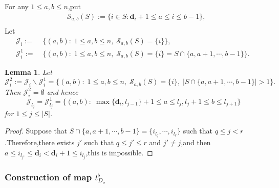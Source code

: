 \documentclass[10pt]{article}
\newtheorem{lem}[thm]{Lemma}
\newcommand{\bd}{{\mathbf{d}}}
\newcommand{\cS}{\mathcal S}
\newcommand{\cJ}{\mathcal J}
\begin{document}
 For any $1\leq a,b\leq n$,\;put
 \begin{equation}
 	\begin{aligned}
 		&\cS_{a,b}(S):=\{i\in S:\bd_i+1\leq a\leq i\leq b-1\},\\
 	\end{aligned}
 \end{equation}
 Let
 \begin{equation}
	\begin{aligned}
		\cJ_i:=&\;\{(a,b):\;1\leq a,b\leq n,\;\cS_{a,b}(S)=\{i\}\},\\
		\cJ^1_i:=&\;\{(a,b):\;1\leq a,b\leq n,\;\cS_{a,b}(S)=\{i\}=S\cap \{a,a+1,\cdots,b-1\}\}.\;
	\end{aligned}
\end{equation}

\begin{lem}\label{lemforcardone} Let 
\begin{equation*}
	\cJ^{2}_i:=\cJ_i\backslash \cJ^1_i=\{(a,b):\;1\leq a,b\leq n,\;\cS_{a,b}(S)=\{i\},\;|S\cap \{a,a+1,\cdots,b-1\}|>1\}.\;
\end{equation*}
Then $\cJ^{2}_i=\emptyset$ and hence
	\[\cJ_{l_j}=\cJ^1_{l_j}=\{(a,b):\;\max\{\bd_i,l_{j-1}\}+1\leq a\leq l_j, l_j+1\leq b\leq l_{j+1}\}\]
	for $1\leq j\leq |S|$.\;
\end{lem}
\begin{proof}
	Suppose that $S\cap \{a,a+1,\cdots,b-1\}=\{i_{l_q},\cdots,i_{l_r}\}$ such that $q\leq j<r$.\;Therefore,\;there exists $j'$ such that  $q\leq j'\leq r$ and $j'\neq j$,\;and then $a\leq i_{l_{j'}}\leq \bd_i<\bd_i+1\leq i_{l_j}$,\;this is impossible.\;
\end{proof}








\subsubsection{Construction of map $t^{\flat}_{D_{\sigma}}$}



\end{document}
